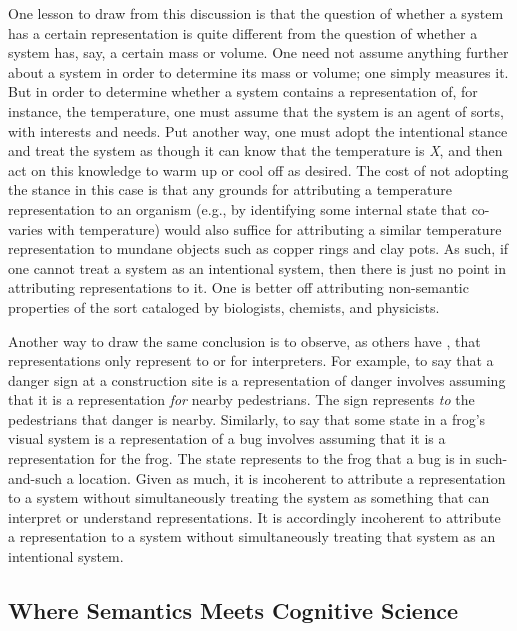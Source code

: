 One lesson to draw from this discussion is that the question of whether a system has a certain representation is quite different from the question of whether a system has, say, a certain mass or volume. One need not assume anything further about a system in order to determine its mass or volume; one simply measures it. But in order to determine whether a system contains a representation of, for instance, the temperature, one must assume that the system is an agent of sorts, with interests and needs. Put another way, one must adopt the intentional stance and treat the system as though it can know that the temperature is \textit{X}, and then act on this knowledge to warm up or cool off as desired. The cost of not adopting the stance in this case is that any grounds for attributing a temperature representation to an organism (e.g., by identifying some internal state that co-varies with temperature) would also suffice for attributing a similar temperature representation to mundane objects such as copper rings and clay pots. As such, if one cannot treat a system as an intentional system, then there is just no point in attributing representations to it. One is better off attributing non-semantic properties of the sort cataloged by biologists, chemists, and physicists.  

Another way to draw the same conclusion is to observe, as others have \citep[e.g.,][]{Brandom:1994}, that representations only represent to or for interpreters. For example, to say that a danger sign at a construction site is a representation of danger involves assuming that it is a representation \textit{for} nearby pedestrians. The sign represents \textit{to} the pedestrians that danger is nearby. Similarly, to say that some state in a frog's visual system is a representation of a bug involves assuming that it is a representation for the frog. The state represents to the frog that a bug is in such-and-such a location. Given as much, it is incoherent to attribute a representation to a system without simultaneously treating the system as something that can interpret or understand representations. It is accordingly incoherent to attribute a representation to a system without simultaneously treating that system as an intentional system.

\subsection{Where Semantics Meets Cognitive Science}

